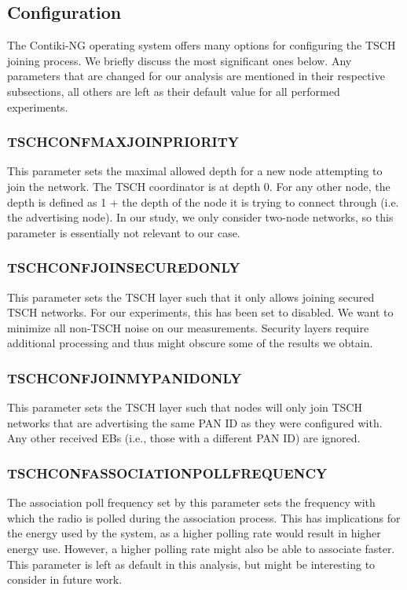 \documentclass[conference]{IEEEtran}
\renewcommand\_{\textunderscore\allowbreak}
\begin{document}
\subsection{Configuration}

The Contiki-NG operating system offers many options for configuring the TSCH joining process. We briefly discuss the most significant ones below. Any parameters that are changed for our analysis are mentioned in their respective subsections, all others are left as their default value for all performed experiments.

\subsubsection{TSCH\_CONF\_MAX\_JOIN\_PRIORITY}
This parameter sets the maximal allowed depth for a new node attempting to join the network. The TSCH coordinator is at depth 0. For any other node, the depth is defined as 1 + the depth of the node it is trying to connect through (i.e. the advertising node). In our study, we only consider two-node networks, so this parameter is essentially not relevant to our case.

\subsubsection{TSCH\_CONF\_JOIN\_SECURED\_ONLY}
This parameter sets the TSCH layer such that it only allows joining secured TSCH networks. For our experiments, this has been set to disabled. We want to minimize all non-TSCH noise on our measurements. Security layers require additional processing and thus might obscure some of the results we obtain. 

\subsubsection{TSCH\_CONF\_JOIN\_MY\_PANID\_ONLY}
This parameter sets the TSCH layer such that nodes will only join TSCH networks that are advertising the same PAN ID as they were configured with. Any other received EBs (i.e., those with a different PAN ID) are ignored. 

\subsubsection{TSCH\_CONF\_ASSOCIATION\_POLL\_FREQUENCY}
The association poll frequency set by this parameter sets the frequency with which the radio is polled during the association process. This has implications for the energy used by the system, as a higher polling rate would result in higher energy use. However, a higher polling rate might also be able to associate faster. This parameter is left as default in this analysis, but might be interesting to consider in future work.
\end{document}
